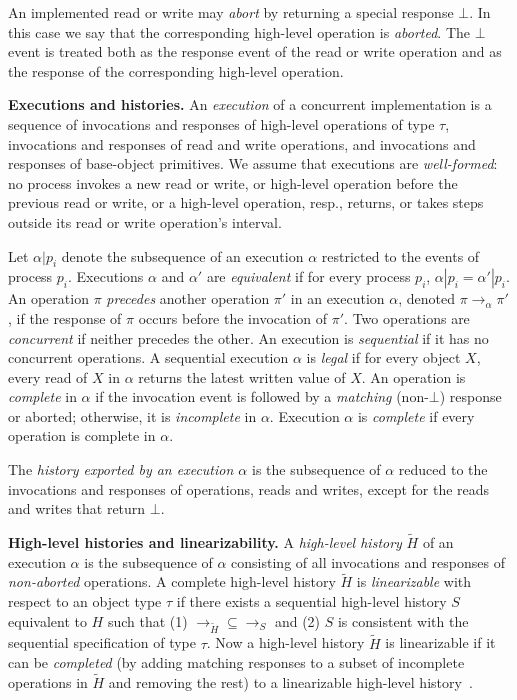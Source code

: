 \documentclass[11pt,pdftex,letterpaper]{article}
\begin{document}
An implemented read or write may \emph{abort} by returning a special response
$\bot$. In this case we say that the corresponding high-level
operation is \emph{aborted}. 
The $\bot$ event is treated both as the response event of the read or
write operation and as the response of the corresponding high-level operation.   

\vspace{1mm}\noindent\textbf{Executions and histories.}
An \emph{execution} of a concurrent implementation is a sequence
of invocations and responses of high-level operations of type $\tau$, invocations and responses of read and write
operations, and invocations and responses of base-object primitives.
We assume that executions are \emph{well-formed}:
no process invokes a new read or write, or high-level operation before
the previous read or write, or a high-level operation, resp., 
returns, or takes steps outside its read or write operation's interval.


Let $\alpha|p_i$ denote the subsequence of an execution $\alpha$
restricted to the events of process $p_i$.
Executions $\alpha$ and $\alpha'$ are \emph{equivalent} if for every process
$p_i$, $\alpha|p_i=\alpha'|p_i$.
An operation $\pi$ \emph{precedes} another operation $\pi'$ in an execution
$\alpha$, 
denoted $\pi \rightarrow_{\alpha} \pi'$, 
if the response of $\pi$ occurs before the invocation of $\pi'$.
Two operations are \emph{concurrent} if neither precedes
the other. 
An execution is \emph{sequential} if it has no concurrent 
operations. 
A sequential execution $\alpha$ is \emph{legal} 
if for every object $X$, every read of $X$ in $\alpha$ 
returns the latest written value of $X$.
An operation is \emph{complete} in $\alpha$ if the invocation event is
followed by a \emph{matching} (non-$\bot$) response or aborted; otherwise, it is \emph{incomplete} in $\alpha$.
Execution $\alpha$ is \emph{complete} if every operation is complete in $\alpha$.

The \emph{history exported by an execution $\alpha$} is
the subsequence of $\alpha$ reduced to the invocations and responses
of operations,  reads and writes, except for the reads
and writes that return $\bot$. 

\vspace{1mm}\noindent\textbf{High-level histories and linearizability.}
A \emph{high-level history} $\tilde H$ of an execution $\alpha$ is the subsequence of $\alpha$ consisting of all
invocations and responses of \emph{non-aborted} operations.
A complete high-level history $\tilde H$ is \emph{linearizable} with 
respect to an object type $\tau$ if there exists
a sequential high-level history $S$ equivalent to $H$ such that
(1) $\rightarrow_{\tilde H}\subseteq \rightarrow_S$ and
(2) $S$ 
is consistent with the sequential specification of type $\tau$.
Now a high-level history $\tilde H$ is linearizable if it can be
\emph{completed} (by adding matching responses to a subset of
incomplete operations in $\tilde H$ and removing the rest)
to a linearizable high-level history~\cite{HW90,AW04}.
\end{document}
